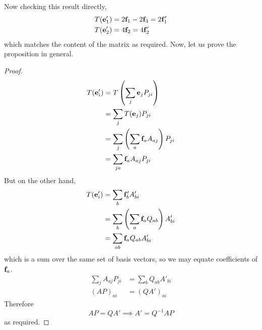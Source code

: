 Now checking this result directly,
\begin{align*}
	T(\vb e'_1) & = 2\vb f_1 - 2\vb f_3 = 2\vb f_1' \\
	T(\vb e'_2) & = 4\vb f_2 = 4\vb f_2'
\end{align*}
which matches the content of the matrix as required.
Now, let us prove the proposition in general.
\begin{proof}
	\begin{align*}
		T(\vb e'_i) & = T\left( \sum_j \vb e_j P_{ji} \right)              \\
		            & = \sum_j T(\vb e_j) P_{ji}                           \\
		            & = \sum_j \left( \sum_a \vb f_a A_{aj} \right) P_{ji} \\
		            & = \sum_{ja} \vb f_a A_{aj} P_{ji}
	\end{align*}
	But on the other hand,
	\begin{align*}
		T(\vb e'_i) & = \sum_b \vb f'_b A'_{bi}                             \\
		            & = \sum_b \left( \sum_a \vb f_a Q_{ab} \right) A'_{bi} \\
		            & = \sum_{ab} \vb f_a Q_{ab} A'_{bi}
	\end{align*}
	which is a sum over the same set of basis vectors, so we may equate coefficients of \(\vb f_a\).
	\begin{align*}
		\sum_j A_{aj} P_{ji} & = \sum_b Q_{ab} A'_{bi} \\
		(AP)_{ai}            & = (QA')_{ai}
	\end{align*}
	Therefore
	\[
		AP = QA' \implies A' = Q^{-1}AP
	\]
	as required.
\end{proof}
